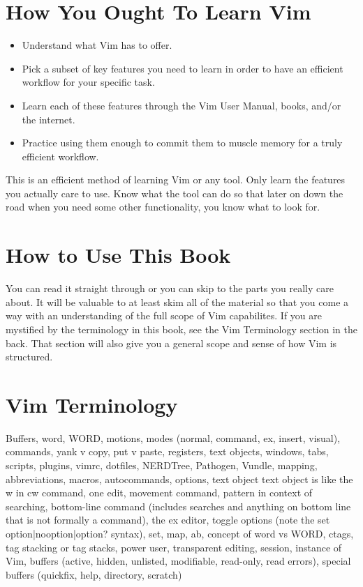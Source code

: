 \documentclass[12pt]{book}
\begin{document}
\section{How You Ought To Learn Vim}
\begin{itemize}
\item Understand what Vim has to offer.
\item Pick a subset of key features you need to learn in order to have an efficient workflow for your specific task.
\item Learn each of these features through the Vim User Manual, books, and/or the internet.
\item Practice using them enough to commit them to muscle memory for a truly efficient workflow. 
\end{itemize}
This is an efficient method of learning Vim or any tool. 
Only learn the features you actually care to use. 
Know what the tool can do so that later on down the road when you need some other functionality, you know what to look for.

\section{How to Use This Book}
You can read it straight through or you can skip to the parts you really care about.  
It will be valuable to at least skim all of the material so that you come a way with an understanding of the full scope of Vim capabilites.
If you are mystified by the terminology in this book, see the Vim Terminology section in the back.
That section will also give you a general scope and sense of how Vim is structured.

\section{Vim Terminology}
Buffers, word, WORD, motions, modes (normal, command, ex, insert, visual), commands, yank v copy, put v paste, registers, text objects, windows, tabs, scripts, plugins, vimrc, dotfiles,
NERDTree, Pathogen, Vundle, mapping, abbreviations, macros, autocommands, options, text object text object is like the w in cw command, one edit, movement command, pattern in context of 
searching, bottom-line command (includes searches and anything on bottom line that is not formally a command), the ex editor, toggle options (note the set option|nooption|option? syntax), 
set, map, ab, concept of word vs WORD, ctags, tag stacking or tag stacks, power user, transparent editing, session, instance of Vim, buffers (active, hidden, unlisted, modifiable, read-only, 
read errors), special buffers (quickfix, help, directory, scratch)
\end{document}
